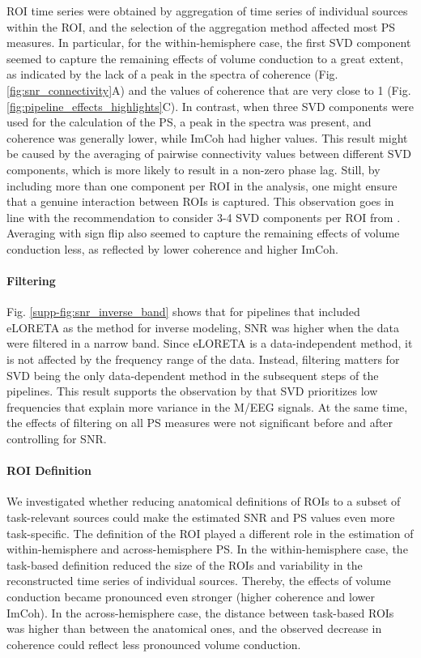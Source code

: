 ROI time series were obtained by aggregation of time series of individual sources within the ROI, and the selection of the aggregation method affected most PS measures. In particular, for the within-hemisphere case, the first SVD component seemed to capture the remaining effects of volume conduction to a great extent, as indicated by the lack of a peak in the spectra of coherence (Fig. \ref{fig:snr_connectivity}A) and the values of coherence that are very close to 1 (Fig. \ref{fig:pipeline_effects_highlights}C). In contrast, when three SVD components were used for the calculation of the PS, a peak in the spectra was present, and coherence was generally lower, while ImCoh had higher values. This result might be caused by the averaging of pairwise connectivity values between different SVD components, which is more likely to result in a non-zero phase lag. Still, by including more than one component per ROI in the analysis, one might ensure that a genuine interaction between ROIs is captured. This observation goes in line with the recommendation to consider 3-4 SVD components per ROI from \citep{Pellegrini2023}. Averaging with sign flip also seemed to capture the remaining effects of volume conduction less, as reflected by lower coherence and higher ImCoh.

\paragraph{Filtering}

Fig. \ref{supp-fig:snr_inverse_band} shows that for pipelines that included eLORETA as the method for inverse modeling, SNR was higher when the data were filtered in a narrow band. Since eLORETA is a data-independent method, it is not affected by the frequency range of the data. Instead, filtering matters for SVD being the only data-dependent method in the subsequent steps of the pipelines. This result supports the observation by \cite{Chalas2022} that SVD prioritizes low frequencies that explain more variance in the M/EEG signals. At the same time, the effects of filtering on all PS measures were not significant before and after controlling for SNR.

\paragraph{ROI Definition}

We investigated whether reducing anatomical definitions of ROIs to a subset of task-relevant sources could make the estimated SNR and PS values even more task-specific. The definition of the ROI played a different role in the estimation of within-hemisphere and across-hemisphere PS. In the within-hemisphere case, the task-based definition reduced the size of the ROIs and variability in the reconstructed time series of individual sources. Thereby, the effects of volume conduction became pronounced even stronger (higher coherence and lower ImCoh). In the across-hemisphere case, the distance between task-based ROIs was higher than between the anatomical ones, and the observed decrease in coherence could reflect less pronounced volume conduction.

